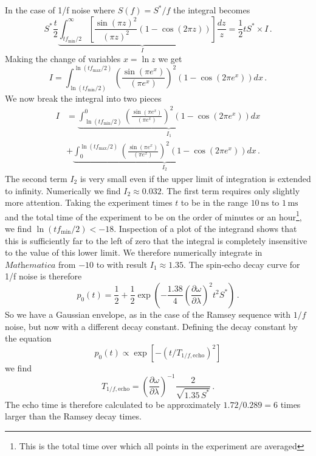 
In the case of 1/f noise where $S(f)=S^{*}/f$ the integral becomes
\begin{equation}
  S^* \frac{t}{2} \underbrace{\int_{t f_{\textrm{min}}/2}^{\infty} \left[ \frac{\sin\left(\pi z\right)^2}{\left(\pi z\right)^2} \left(1 - \cos\left(2\pi z\right)\right) \right] \frac{dz}{z}}_I
  = \frac{1}{2} t S^{*} \times I \, .
\end{equation}
Making the change of variables $x=\ln z$ we get
\begin{equation}
  I = \int_{\ln\left(tf_{\textrm{min}}/2\right)}^{\ln\left(tf_{\textrm{max}}/2\right)}\left(\frac{\sin\left(\pi e^{x}\right)}{\left(\pi e^{x}\right)}\right)^{2}\left(1-\cos\left(2\pi e^{x}\right)\right)dx \, .
\end{equation}
We now break the integral into two pieces
\begin{align}
I &=
\underbrace{\int_{\ln\left(tf_{\textrm{min}}/2\right)}^{0}\left(\frac{\sin\left(\pi e^{x}\right)}{\left(\pi e^{x}\right)}\right)^{2}\left(1-\cos\left(2\pi e^{x}\right)\right)dx}_{I_{1}} \nonumber \\
&+ \underbrace{\int_{0}^{\ln\left(tf_{\textrm{max}}/2\right)}\left(\frac{\sin\left(\pi e^{x}\right)}{\left(\pi e^{x}\right)}\right)^{2}\left(1-\cos\left(2\pi e^{x}\right)\right)dx}_{I_{2}} \, .
\end{align}
The second term $I_{2}$ is very small even if the upper limit of integration is extended to infinity.
Numerically we find $I_{2}\approx0.032$.
The first term requires only slightly more attention.
Taking the experiment times $t$ to be in the range $10\,\text{ns}$ to $1\,\text{ms}$ and the total time of the experiment to be on the order of minutes or an hour\footnote{This is the total time over which all points in the experiment are averaged}, we find $\ln(t f_{\text{min}} / 2) < -18$.
Inspection of a plot of the integrand shows that this is sufficiently far to the left of zero that the integral is completely insensitive to the value of this lower limit.
We therefore numerically integrate in $\textit{Mathematica}$ from $-10$ to with result $I_1 \approx 1.35$.
The spin-echo decay curve for 1/f noise is therefore
\begin{equation}
  p_0(t) = \frac{1}{2} + \frac{1}{2} \exp \left(-\frac{1.38}{4} \left( \frac{\partial\omega}{\partial\lambda} \right)^2 t^2 S^* \right) \, .
\end{equation}
So we have a Gaussian envelope, as in the case of the Ramsey sequence with $1/f$ noise, but now with a different decay constant.
Defining the decay constant by the equation
\begin{equation}
  p_0(t) \propto \exp \left[ - \left( t / T_{1/f,\text{echo}} \right)^2 \right]
\end{equation}
we find
\begin{equation}
  T_{1/f,\textrm{echo}}
  = \left( \frac{\partial\omega}{\partial\lambda} \right)^{-1} \frac{2}{\sqrt{1.35 \, S^*}}
  \, .
\end{equation}
The echo time is therefore calculated to be approximately $1.72/0.289=6$ times larger than the Ramsey decay times.

